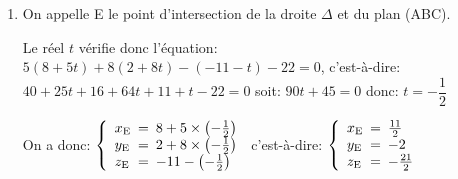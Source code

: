 \documentclass[10pt]{article}
\providecommand{\R}{\mathbb{R}}
\providecommand{\vect}[1]{\overrightarrow{#1}}
\providecommand{\vectt}[1]{\overrightarrow{\mathrm{#1}}}
\begin{document}
\begin{enumerate}
\begin{enumerate}[label=\textbf{\alph*.}]
La droite $\Delta$ est orthogonale au plan (ABC) donc elle a pour vecteur directeur n'importe quel vecteur normal au plan, en particulier le vecteur $\vect{n}$.

La droite $\Delta$  est donc l'ensemble des points M\,$(x\;;\;y\;;\;z)$ tels que $\vectt{DM}$ et $\vect{n}$ soient colinéaires, c'est-à-dire tels que $\vectt{DM}=t.\vect{n}$ avec $t\in\R$.

$\vectt{DM}=t.\vect{n}
\iff
\left \{
\begin{array}{l !{=} l}
x-8 & 5t\\
y-2 & 8t\\
z-(-11) & -t
\end{array}
\right .
\iff
\left \{
\begin{array}{l !{=} l}
x & 8+5t\\
y & 2+8t\\
z & -11 -t
\end{array}
\right .$

Donc une représentation paramétrique de la droite $\Delta$ est:
$\left \{
\begin{array}{l !{=} l}
x & 8+5t\\
y & 2+8t, \text{~~avec } t\in\R\\
z & -11 -t
\end{array}
\right .$

		\item On appelle E le point d'intersection de la droite $\Delta$ et du plan (ABC).




Le réel $t$ vérifie donc l'équation:
$5\left (8+5t\right ) + 8\left (2+8t\right ) - \left (-11-t\right )-22=0$,
c'est-à-dire:
$40+25t+16+64t+11+t-22=0$
soit:
$90t +45=0$
donc: $t=-\dfrac{1}{2}$

On a donc:
$\left \{
\begin{array}{l !{=} l}
x_{\text E} & 8+5 \times \left (- \frac{1}{2}\right )\\
y_{\text E} & 2+8\times \left (- \frac{1}{2}\right )\\
z_{\text E} & -11 - \left (- \frac{1}{2}\right )
\end{array}
\right .$
c'est-à-dire:
$\left \{
\begin{array}{l !{=} l}
x_{\text E} &  \frac{11}{2}\\
y_{\text E} & -2\\
z_{\text E} & - \frac{21}{2}
\end{array}
\right .$


\end{enumerate}
\end{enumerate}
\end{document}
